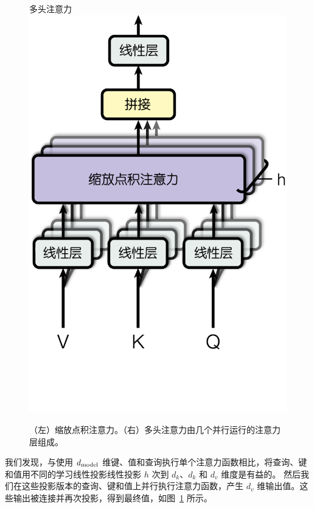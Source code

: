 \begin{figure}
\begin{minipage}[t]{0.5\textwidth}
\end{minipage}
\begin{minipage}[t]{0.5\textwidth}
  \centering 
  多头注意力 \\
  \vspace{0.1cm}
  \includegraphics[scale=0.6]{Figures/ModalNet-20}  
\end{minipage}



  \caption{（左）缩放点积注意力。（右）多头注意力由几个并行运行的注意力层组成。}
  \label{fig:multi-head-att}
\end{figure}

我们发现，与使用 $d_{\text{model}}$ 维键、值和查询执行单个注意力函数相比，将查询、键和值用不同的学习线性投影线性投影 $h$ 次到 $d_k$、$d_k$ 和 $d_v$ 维度是有益的。
然后我们在这些投影版本的查询、键和值上并行执行注意力函数，产生 $d_v$ 维输出值。这些输出被连接并再次投影，得到最终值，如图~\ref{fig:multi-head-att} 所示。

